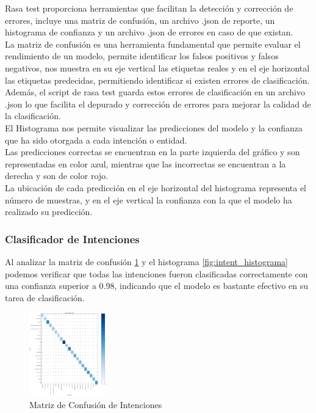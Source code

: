 Rasa test proporciona herramientas que facilitan la detección y corrección de errores, incluye una
matriz de confusión, un archivo .json de reporte, un histograma de confianza y un archivo .json de
errores en caso de que existan.\\
\indent La matriz de confusión es una herramienta fundamental que permite evaluar el rendimiento de un
modelo, permite identificar los falsos positivos y falsos negativos, nos muestra en su eje vertical las etiquetas reales y en el eje horizontal las etiquetas predecidas, permitiendo identificar si
existen errores de clasificación.\\
\indent Además, el script de rasa test guarda estos errores de clasificación en un archivo .json lo que
facilita el depurado y corrección de errores para mejorar la calidad de la clasificación.\\
\indent El Histograma nos permite visualizar las predicciones del modelo y la confianza que ha sido
otorgada a cada intención o entidad.\\
\indent Las predicciones correctas se encuentran en la parte izquierda del gráfico y son representadas en
color azul, mientras que las incorrectas se encuentran a la derecha y son de color rojo.\\
\indent La ubicación de cada predicción en el eje horizontal del histograma representa el número de
muestras, y en el eje vertical la confianza con la que el modelo ha realizado su predicción. \cite{interpretacion_graficos}

\subsubsection{Clasificador de Intenciones}
Al analizar la matriz de confusión \ref{fig:intent_matriz} y el histograma
\ref{fig:intent_histograma} podemos verificar que todas las intenciones fueron clasificadas
correctamente con una confianza superior a 0.98, indicando que el modelo es bastante efectivo en su
tarea de clasificación.
\begin{figure}[H]
	\centering
	\includegraphics[angle=0,width=0.3\textwidth]{Figuras/intent_confusion_matrix.png}
	\caption{Matriz de Confusión de Intenciones}
	\label{fig:intent_matriz}
\end{figure}

